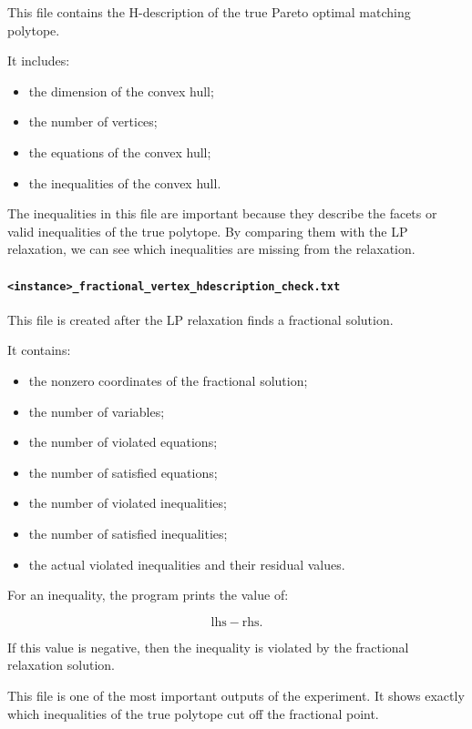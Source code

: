 \documentclass[12pt]{report}
\numberwithin{algorithm}{chapter}
\begin{document}
	This file contains the H-description of the true Pareto optimal matching polytope.
	
	It includes:
	
	\begin{itemize}
		\item the dimension of the convex hull;
		\item the number of vertices;
		\item the equations of the convex hull;
		\item the inequalities of the convex hull.
	\end{itemize}
	
	The inequalities in this file are important because they describe the facets or valid inequalities of the true polytope. By comparing them with the LP relaxation, we can see which inequalities are missing from the relaxation.
	
	\paragraph{\texttt{<instance>\_fractional\_vertex\_hdescription\_check.txt}}
	
	This file is created after the LP relaxation finds a fractional solution.
	
	It contains:
	
	\begin{itemize}
		\item the nonzero coordinates of the fractional solution;
		\item the number of variables;
		\item the number of violated equations;
		\item the number of satisfied equations;
		\item the number of violated inequalities;
		\item the number of satisfied inequalities;
		\item the actual violated inequalities and their residual values.
	\end{itemize}
	
	For an inequality, the program prints the value of:
	
	\[
	\text{lhs} - \text{rhs}.
	\]
	
	If this value is negative, then the inequality is violated by the fractional relaxation solution.
	
	This file is one of the most important outputs of the experiment. It shows exactly which inequalities of the true polytope cut off the fractional point.
	
\end{document}
